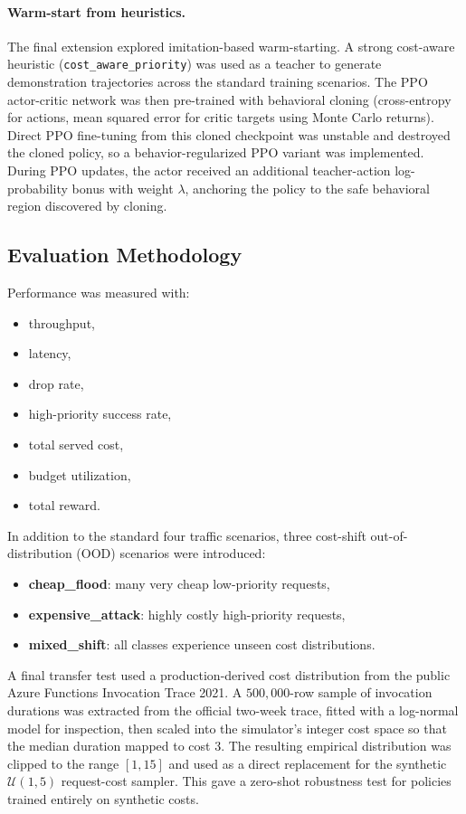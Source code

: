 \documentclass[conference]{IEEEtran}
\begin{document}
\paragraph{Warm-start from heuristics.}
The final extension explored imitation-based warm-starting. A strong cost-aware heuristic (\texttt{cost\_aware\_priority}) was used as a teacher to generate demonstration trajectories across the standard training scenarios. The PPO actor-critic network was then pre-trained with behavioral cloning (cross-entropy for actions, mean squared error for critic targets using Monte Carlo returns). Direct PPO fine-tuning from this cloned checkpoint was unstable and destroyed the cloned policy, so a behavior-regularized PPO variant was implemented. During PPO updates, the actor received an additional teacher-action log-probability bonus with weight $\lambda$, anchoring the policy to the safe behavioral region discovered by cloning.

\subsection{Evaluation Methodology}
Performance was measured with:
\begin{itemize}[leftmargin=1.5em]
    \item throughput,
    \item latency,
    \item drop rate,
    \item high-priority success rate,
    \item total served cost,
    \item budget utilization,
    \item total reward.
\end{itemize}

In addition to the standard four traffic scenarios, three cost-shift out-of-distribution (OOD) scenarios were introduced:
\begin{itemize}[leftmargin=1.5em]
    \item \textbf{cheap\_flood}: many very cheap low-priority requests,
    \item \textbf{expensive\_attack}: highly costly high-priority requests,
    \item \textbf{mixed\_shift}: all classes experience unseen cost distributions.
\end{itemize}

A final transfer test used a production-derived cost distribution from the public Azure Functions Invocation Trace 2021. A $500{,}000$-row sample of invocation durations was extracted from the official two-week trace, fitted with a log-normal model for inspection, then scaled into the simulator's integer cost space so that the median duration mapped to cost $3$. The resulting empirical distribution was clipped to the range $[1,15]$ and used as a direct replacement for the synthetic $\mathcal{U}(1,5)$ request-cost sampler. This gave a zero-shot robustness test for policies trained entirely on synthetic costs.
\end{document}
